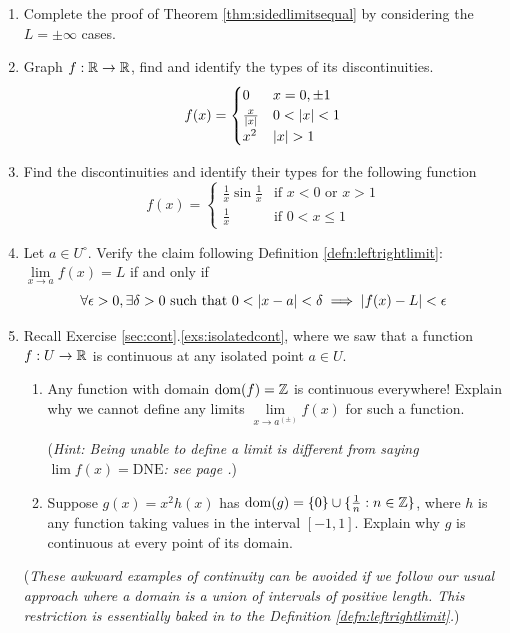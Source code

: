 \begin{exercises}
\begin{enumerate}
	  
	  \item Complete the proof of Theorem \ref{thm:sidedlimitsequal} by considering the $L=\pm\infty$ cases.
	  
	  
	  \item Graph $f:\mathbb{R}\to\mathbb{R}$, find and identify the types of its discontinuities.
	  \[
	  	f(x)=
	  	\begin{cases}
	    	0&x=0,\pm 1\\
	      \frac x{\nm x}&0<\nm x<1\\
	      x^2&\nm x>1
	    \end{cases}
	  \]
	  
	  
	  \item Find the discontinuities and identify their types for the following function
	  \[
	  	f(x)=
	  	\begin{cases}
	  		\frac 1x\sin\frac 1x&\text{if $x<0$ or $x>1$}\\
	  		\frac 1x&\text{if }0<x\le 1
	  	\end{cases}
	  \]
	  
	  
	  \item Let $a\in U^\circ$. Verify the claim following Definition \ref{defn:leftrightlimit}: $\lim\limits_{x\to a}f(x)=L$ if and only if
	  \[
	  	\forall\epsilon>0,\exists\delta>0\text{ such that }0<\left| x-a\right|<\delta\implies \left| f(x)-L\right|<\epsilon
	  \]
	  
	  
	  \item Recall Exercise \ref*{sec:cont}.\ref{exs:isolatedcont}, where we saw that a function $f:U\to\mathbb{R}$ is continuous at any isolated point $a\in U$.
	  \begin{enumerate}
	    \item Any function with domain $\operatorname{dom}(f)=\mathbb{Z}$ is continuous everywhere! Explain why we cannot define any limits $\lim\limits_{x\to a^{(\pm)}}f(x)$ for such a function.\par
	    (\emph{Hint: Being unable to define a limit is different from saying $\lim f(x)=\text{DNE}$: see page \pageref{it:contlimit}.})
	    \item Suppose $g(x)=x^2h(x)$ has $\operatorname{dom}(g)=\{0\}\cup\{\tfrac 1n:n\in\mathbb{Z}\}$, where $h$ is any function taking values in the interval $[-1,1]$. Explain why $g$ is continuous at every point of its domain.
		\end{enumerate}
		(\emph{These awkward examples of continuity can be avoided if we follow our usual approach where a domain is a union of intervals of positive length. This restriction is essentially baked in to the Definition \ref{defn:leftrightlimit}.})
	  
	\end{enumerate}
\end{exercises}